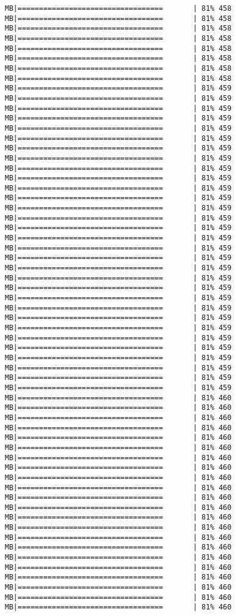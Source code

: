 \documentclass[
]{article}
\begin{document}
\begin{verbatim}
MB|==================================       | 81% 458 MB|==================================       | 81% 458 MB|==================================       | 81% 458 MB|==================================       | 81% 458 MB|==================================       | 81% 458 MB|==================================       | 81% 458 MB|==================================       | 81% 458 MB|==================================       | 81% 458 MB|==================================       | 81% 459 MB|==================================       | 81% 459 MB|==================================       | 81% 459 MB|==================================       | 81% 459 MB|==================================       | 81% 459 MB|==================================       | 81% 459 MB|==================================       | 81% 459 MB|==================================       | 81% 459 MB|==================================       | 81% 459 MB|==================================       | 81% 459 MB|==================================       | 81% 459 MB|==================================       | 81% 459 MB|==================================       | 81% 459 MB|==================================       | 81% 459 MB|==================================       | 81% 459 MB|==================================       | 81% 459 MB|==================================       | 81% 459 MB|==================================       | 81% 459 MB|==================================       | 81% 459 MB|==================================       | 81% 459 MB|==================================       | 81% 459 MB|==================================       | 81% 459 MB|==================================       | 81% 459 MB|==================================       | 81% 459 MB|==================================       | 81% 459 MB|==================================       | 81% 459 MB|==================================       | 81% 459 MB|==================================       | 81% 459 MB|==================================       | 81% 459 MB|==================================       | 81% 459 MB|==================================       | 81% 459 MB|==================================       | 81% 460 MB|==================================       | 81% 460 MB|==================================       | 81% 460 MB|==================================       | 81% 460 MB|==================================       | 81% 460 MB|==================================       | 81% 460 MB|==================================       | 81% 460 MB|==================================       | 81% 460 MB|==================================       | 81% 460 MB|==================================       | 81% 460 MB|==================================       | 81% 460 MB|==================================       | 81% 460 MB|==================================       | 81% 460 MB|==================================       | 81% 460 MB|==================================       | 81% 460 MB|==================================       | 81% 460 MB|==================================       | 81% 460 MB|==================================       | 81% 460 MB|==================================       | 81% 460 MB|==================================       | 81% 460 MB|==================================       | 81% 460 MB|==================================       | 81% 460 
\end{verbatim}
\end{document}
